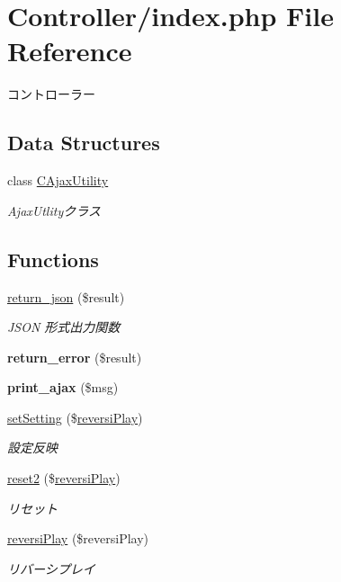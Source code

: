 \hypertarget{index_8php}{}\section{Controller/index.php File Reference}
\label{index_8php}


コントローラー  


\subsection*{Data Structures}
\begin{DoxyCompactItemize}
\item 
class \hyperlink{class_c_ajax_utility}{C\+Ajax\+Utility}
\begin{DoxyCompactList}\small\item\em Ajax\+Utlityクラス \end{DoxyCompactList}\end{DoxyCompactItemize}
\subsection*{Functions}
\begin{DoxyCompactItemize}
\item 
\hyperlink{index_8php_aea83396ad3849fe862e4de15675a0581}{return\+\_\+json} (\$result)
\begin{DoxyCompactList}\small\item\em J\+S\+ON 形式出力関数 \end{DoxyCompactList}\item 
\mbox{\label{index_8php_a0cd29293f595621115eb6fbdcf5f4ac3}} 
{\bfseries return\+\_\+error} (\$result)
\item 
\mbox{\label{index_8php_a83c650c054ddc457419f70537259cd38}} 
{\bfseries print\+\_\+ajax} (\$msg)
\item 
\hyperlink{index_8php_a91c122532b7417905e420c358e413f80}{set\+Setting} (\$\hyperlink{index_8php_a81e6891a5c38d4d0dedd74382f3e9353}{reversi\+Play})
\begin{DoxyCompactList}\small\item\em 設定反映 \end{DoxyCompactList}\item 
\hyperlink{index_8php_aefe1b9913b0e57099bae4fdc60d30650}{reset2} (\$\hyperlink{index_8php_a81e6891a5c38d4d0dedd74382f3e9353}{reversi\+Play})
\begin{DoxyCompactList}\small\item\em リセット \end{DoxyCompactList}\item 
\hyperlink{index_8php_a81e6891a5c38d4d0dedd74382f3e9353}{reversi\+Play} (\$reversi\+Play)
\begin{DoxyCompactList}\small\item\em リバーシプレイ \end{DoxyCompactList}\end{DoxyCompactItemize}
